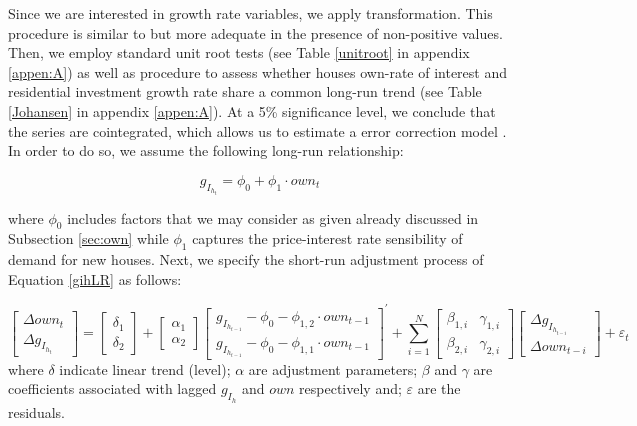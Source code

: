 \documentclass[12pt, a4paper]{article}
\begin{document}
Since we are interested in growth rate variables, we apply \textcite{yeo_new_2000} transformation.
This procedure is similar to \textcite{box_analysis_1964} but more adequate in the presence of non-positive values.
Then, we employ standard unit root tests (see Table \ref{unitroot} in appendix \ref{appen:A}) as well as \textcite{johansen_estimation_1991} procedure to assess whether houses own-rate of interest and residential investment growth rate share a common long-run trend (see Table \ref{Johansen} in appendix \ref{appen:A}).
At a 5\% significance level, we conclude that the series are cointegrated, which allows us to estimate a error correction model \cite{enders_applied_2014}.
In order to do so, we assume the following long-run relationship:

\begin{latex}
\begin{equation}
\label{gihLR}
g_{I_{h_{t}}} = \phi_{0} + \phi_{1}\cdot own_{t}
\end{equation}
\end{latex}
where \(\phi_0\) includes factors that we may consider as given already discussed in Subsection \ref{sec:own} while \(\phi_1\) captures the price-interest rate sensibility of demand for new houses.
Next, we specify the short-run adjustment process of Equation \ref{gihLR} as follows:

\begin{equation}
\label{matrix}
\begin{bmatrix}
\Delta own_{t}\\
\Delta g_{I_{h_{t}}}
\end{bmatrix} = \begin{bmatrix}\delta_{1}\\ \delta_{2}\end{bmatrix} + \begin{bmatrix}\alpha_{1}\\ \alpha_{2}\end{bmatrix} \begin{bmatrix}g_{I_{h_{t-1}}} - \phi_{0} - \phi_{1,2}\cdot own_{t-1}\\g_{I_{h_{t-1}}} - \phi_{0} - \phi_{1,1}\cdot own_{t-1}\end{bmatrix}^{\prime} + \sum^N_{i=1} \begin{bmatrix}\beta_{1,i} & \gamma_{1,i} \\\beta_{2,i} & \gamma_{2,i} \end{bmatrix} \begin{bmatrix}\Delta g_{I_{h_{t-i}}} \\\Delta own_{t-i}\end{bmatrix} + \varepsilon_{t}
\end{equation}
where \(\delta\) indicate linear trend (level);
\(\alpha\) are adjustment parameters;
\(\beta\) and \(\gamma\) are coefficients associated with lagged \(g_{I_h}\) and \(own\) respectively and; \(\varepsilon\) are the residuals.
\end{document}
